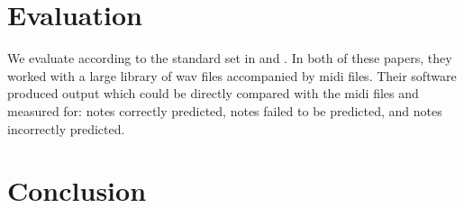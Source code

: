 \documentclass{article}
\begin{document}
\section{Evaluation}
We evaluate according to the standard set in \cite{poliner2006discriminative} and \cite{bock2012polyphonic}.
In both of these papers, they worked with a large library of wav files accompanied by midi files. Their software produced
output which could be directly compared with the midi files and measured for: notes correctly predicted, notes failed to be predicted, and notes incorrectly predicted.



\section{Conclusion}




\end{document}

